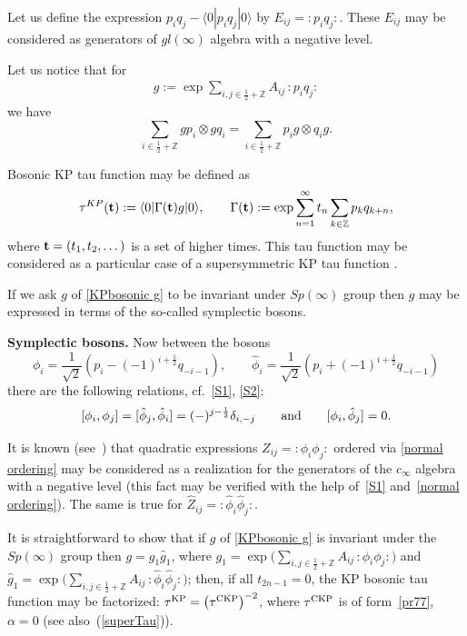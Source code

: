 \documentclass[pdftex]{sigma}
\numberwithin{equation}{section}
\newcommand{\bt}{{\bf {t}}}
\renewcommand{\l}{\langle}
\renewcommand{\r}{\rangle}
\begin{document}
Let us def\/ine the expression $p_iq_j-\l 0|p_iq_j |0\r$  by $E_{ij}={:}p_iq_j{:}$. These $E_{ij}$ may be considered
as generators of $gl(\infty)$ algebra with a negative level.


 Let us notice that for
  \begin{gather}\label{KPbosonic g}
g:=\exp \sum_{i,j\in \frac 12+\mathbb{Z}} A_{ij}\,{:}p_iq_j{:}
  \end{gather}
  we have
\[
\sum_{i\in\frac12 + \mathbb{Z}}gp_i\otimes
gq_i = \sum_{i\in\frac12 + \mathbb{Z}}p_ig\otimes q_ig .
\]

Bosonic KP tau function may be def\/ined as
 \[
  \tau^{KP}(\bt):=\l 0|\Gamma(\bt) g |0\r ,\qquad \Gamma(\bt):=\exp \sum_{n=1}^\infty t_n \sum_{k\in\mathbb{Z}} p_kq_{k+n} ,
 \]
where $\bt=(t_1,t_2,\dots)$ is a set of higher times. This tau function may be considered as a particular case
of a supersymmetric KP tau function \cite{Kac-Leur}.

If we ask $g$ of \eqref{KPbosonic g} to be invariant under $Sp(\infty)$ group then $g$ may be expressed in terms of
the so-called symplectic bosons.


{\bf Symplectic bosons.} Now between the bosons
\[
\phi_{i}=\frac1{\sqrt{2}}\left(p_{i}-(-1)^{i+\frac12}q_{-i-1}\right) ,\qquad
\hat{\phi}_{i}=\frac1{\sqrt{2}}\left(p_{i}+(-1)^{i+\frac12}q_{-i-1}\right)
\]
there are the following relations, cf.~\eqref{S1}, \eqref{S2}:
\[
 [\phi_{i},\phi_j]=[\hat{\phi}_{j},\hat{\phi}_i]=(-)^{j-\frac{1}{2}}\delta_{i,-j}
\qquad\hbox{and}\qquad
 [\phi_{i},\hat{\phi}_j]=0.
\]

It is known (see~\cite{Kac-Leur}) that quadratic expressions $Z_{ij}={:}\phi_i\phi_j{:}$ ordered via \eqref{normal ordering} may
be considered as a realization for the generators of the $c_\infty$ algebra with a negative level (this fact may be verif\/ied
with the help of~\eqref{S1} and~\eqref{normal ordering}). The same is true for $\hat{Z}_{ij}={:}\hat{\phi}_i\hat{\phi}_j{:}$.

It is straightforward to show that if $g$ of \eqref{KPbosonic g} is invariant under the  $Sp(\infty)$ group then $g=g_1\hat{g}_1$, where
$g_1=\exp \Big(\sum\limits_{i,j\in \frac 12+\mathbb{Z}} A_{ij}\,{:}\phi_i\phi_j{:}\Big)$ and
$\hat{g}_1=\exp\Big(\sum\limits_{i,j\in \frac 12+\mathbb{Z}} A_{ij}\,{:}\hat{\phi}_i\hat{\phi}_j{:} \Big)$; then, if all $t_{2n-1}=0$, the KP
bosonic tau function may be factorized: $\tau^{\rm KP}=\left(\tau^{\rm CKP} \right)^{-2}$, where $ \tau^{\rm CKP}$ is of form~\eqref{pr77},
 $\alpha=0$ (see also~(\ref{superTau})).
\end{document}
